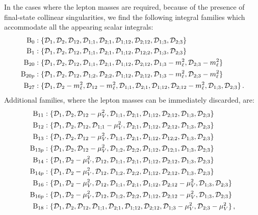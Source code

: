 \documentclass[11pt,a4paper]{article}
\begin{document}
In the cases where the lepton masses are required,
because of the presence of final-state collinear singularities,
we find the following integral families which accommodate
all the appearing scalar integrals:
\begin{align}
  \label{eq:Basisml}
  {\rm B}_{0} &: \{ {\cal D}_1, {\cal D}_2, {\cal D}_{12}, {\cal D}_{1;1}, {\cal D}_{2;1}, {\cal D}_{1;12}, {\cal D}_{2;12}, {\cal D}_{1;3}, {\cal D}_{2;3} \}
              \nonumber\\
  {\rm B}_{1} &: \{ {\cal D}_1, {\cal D}_2, {\cal D}_{12}, {\cal D}_{1;1}, {\cal D}_{2;1}, {\cal D}_{1;12}, {\cal D}_{12;2}, {\cal D}_{1;3}, {\cal D}_{2;3} \}
              \nonumber\\
  {\rm B}_{20} &: \{ {\cal D}_1, {\cal D}_2, {\cal D}_{12}, {\cal D}_{1;1}, {\cal D}_{2;1}, {\cal D}_{1;12}, {\cal D}_{2;12}, {\cal D}_{1;3}-m_\ell^2, {\cal D}_{2;3}-m_\ell^2 \}
              \nonumber\\
  {\rm B}_{20p} &: \{ {\cal D}_1, {\cal D}_2, {\cal D}_{12}, {\cal D}_{1;2}, {\cal D}_{2;2}, {\cal D}_{1;12}, {\cal D}_{2;12}, {\cal D}_{1;3}-m_\ell^2, {\cal D}_{2;3}-m_\ell^2 \}
              \nonumber\\
  {\rm B}_{27} &: \{ {\cal D}_1, {\cal D}_2-m_\ell^2, {\cal D}_{12}-m_\ell^2, {\cal D}_{1;1}, {\cal D}_{2;1}, {\cal D}_{1;12}, {\cal D}_{2;12}-m_\ell^2, {\cal D}_{1;3}, {\cal D}_{2;3} \}\, .
\end{align}
%
Additional families, where the lepton masses can be immediately discarded, are:
\begin{align}
  \label{eq:Basis0}
  {\rm B}_{11} &: \{ \cD_1, \cD_2, \cD_{12}-\mu_V^2, \cD_{1;1}, \cD_{2;1}, \cD_{1;12}, \cD_{2;12}, \cD_{1;3}, \cD_{2;3} \}
              \nonumber\\
  {\rm B}_{12} &: \{ \cD_1, \cD_2, \cD_{12}, \cD_{1;1}-\mu_V^2, \cD_{2;1}, \cD_{1;12}, \cD_{2;12}, \cD_{1;3}, \cD_{2;3} \}
              \nonumber\\
  {\rm B}_{13} &: \{ \cD_1, \cD_2, \cD_{12}-\mu_V^2, \cD_{1;1}, \cD_{2;1}, \cD_{1;12}, \cD_{12;2}, \cD_{1;3}, \cD_{2;3} \}
              \nonumber\\
  {\rm B}_{13p} &: \{ \cD_1, \cD_2, \cD_{12}-\mu_V^2, \cD_{1;2}, \cD_{2;2}, \cD_{1;12}, \cD_{12;1}, \cD_{1;3}, \cD_{2;3} \}
              \nonumber\\
  {\rm B}_{14} &: \{ \cD_1, \cD_2-\mu_V^2, \cD_{12}, \cD_{1;1}, \cD_{2;1}, \cD_{1;12}, \cD_{2;12}, \cD_{1;3}, \cD_{2;3} \}
              \nonumber\\
  {\rm B}_{14p} &: \{ \cD_1, \cD_2-\mu_V^2, \cD_{12}, \cD_{1;2}, \cD_{2;2}, \cD_{1;12}, \cD_{2;12}, \cD_{1;3}, \cD_{2;3} \}
              \nonumber\\
  {\rm B}_{16} &: \{ \cD_1, \cD_2-\mu_V^2, \cD_{12}, \cD_{1;1}, \cD_{2;1}, \cD_{1;12}, \cD_{2;12}-\mu_V^2, \cD_{1;3}, \cD_{2;3} \}
              \nonumber\\
  {\rm B}_{16p} &: \{ \cD_1, \cD_2-\mu_V^2, \cD_{12}, \cD_{1;2}, \cD_{2;2}, \cD_{1;12}, \cD_{2;12}-\mu_V^2, \cD_{1;3}, \cD_{2;3} \}
              \nonumber\\
  {\rm B}_{18} &: \{ \cD_1, \cD_2, \cD_{12}, \cD_{1;1}, \cD_{2;1}, \cD_{1;12}, \cD_{2;12}, \cD_{1;3}-\mu_V^2, \cD_{2;3}-\mu_V^2 \}\,,
%
%
\end{align}
\end{document}
